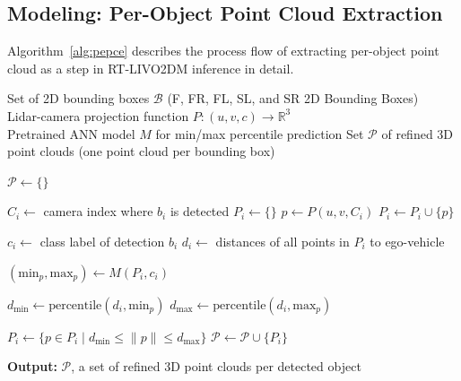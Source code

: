 \subsection{Modeling: Per-Object Point Cloud Extraction}

Algorithm~\ref{alg:pepce} describes the process flow of extracting per-object point cloud as a step in RT-LIVO2DM inference in detail.

\begin{algorithm}[H]
\caption{Per-object Point Cloud Extraction}
\label{alg:pepce}
\begin{algorithmic}[1]
\Require Set of 2D bounding boxes $\mathcal{B}$ (F, FR, FL, SL, and SR 2D Bounding Boxes) \\
         Lidar-camera projection function $P: (u, v, c) \rightarrow \mathbb{R}^3$ \\
         Pretrained ANN model $M$ for min/max percentile prediction
\Ensure Set $\mathcal{P}$ of refined 3D point clouds (one point cloud per bounding box)

\State $\mathcal{P} \gets \{\}$ 

    \State $C_i \gets$ camera index where $b_i$ is detected
    \State $P_i \gets \{\}$ 
        \State $p \gets P(u, v, C_i)$ 
            \State $P_i \gets P_i \cup \{p\}$
        \EndIf
    \EndFor

    \State $c_i \gets$ class label of detection $b_i$
    \State $d_i \gets$ distances of all points in $P_i$ to ego-vehicle

    \State $(\text{min}_p, \text{max}_p) \gets M(P_i, c_i)$

    \State $d_{\text{min}} \gets \text{percentile}(d_i, \text{min}_p)$
    \State $d_{\text{max}} \gets \text{percentile}(d_i, \text{max}_p)$

    \State $P_i \gets \{p \in P_i \mid d_{\text{min}} \leq \|p\| \leq d_{\text{max}}\}$
    \State $\mathcal{P} \gets \mathcal{P} \cup \{P_i\}$ 
\EndFor

\State \textbf{Output:} $\mathcal{P}$, a set of refined 3D point clouds per detected object
\end{algorithmic}
\end{algorithm}


